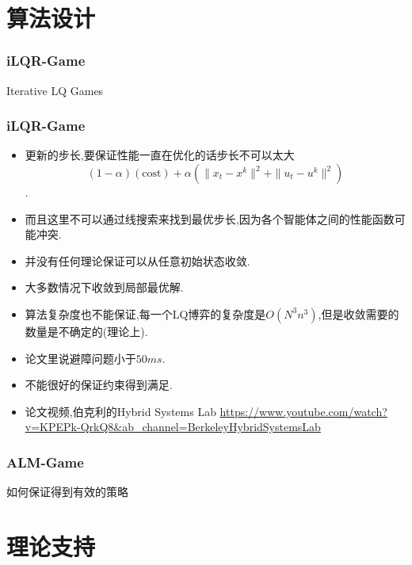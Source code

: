 \documentclass[UTF8, aspectratio=169, 9pt]{ctexbeamer}
\begin{document}
\section{算法设计}
\begin{frame}
\frametitle{iLQR-Game}

\begin{algorithm}[H]
\caption{Iterative LQ Games}%
\LinesNumbered %

\end{algorithm}

\end{frame}


\begin{frame}
\frametitle{iLQR-Game}
\begin{itemize}
  \item 更新的步长,要保证性能一直在优化的话步长不可以太大
  $$
  (1-\alpha)(\text{cost})+\alpha(\| x_t - x^k \|^2 + \| u_t - u^k \|^2)
  $$.
  \item 而且这里不可以通过线搜索来找到最优步长,因为各个智能体之间的性能函数可能冲突.
  \item 并没有任何理论保证可以从任意初始状态收敛.
  \item 大多数情况下收敛到局部最优解.
  \item 算法复杂度也不能保证,每一个LQ博弈的复杂度是$O(N^3 n^3)$,但是收敛需要的数量是不确定的(理论上).
  \item 论文里说避障问题小于$50ms$.
  \item 不能很好的保证约束得到满足.
  \item 论文视频,伯克利的Hybrid Systems Lab \url{https://www.youtube.com/watch?v=KPEPk-QrkQ8&ab_channel=BerkeleyHybridSystemsLab}
\end{itemize}
\end{frame}

\begin{frame}
\frametitle{ALM-Game}
  如何保证得到有效的策略
\end{frame}



\section{理论支持}
\begin{frame}

\end{frame}
\end{document}

